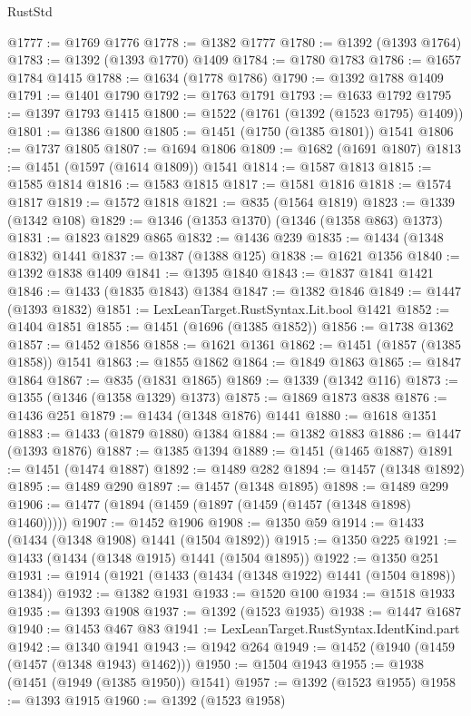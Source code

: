 \begin{lexlean}{RustStd}
\begin{coremodule}
@1777 := @1769 @1776
@1778 := @1382 @1777
@1780 := @1392 (@1393 @1764)
@1783 := @1392 (@1393 @1770) @1409
@1784 := @1780 @1783
@1786 := @1657 @1784 @1415
@1788 := @1634 (@1778 @1786)
@1790 := @1392 @1788 @1409
@1791 := @1401 @1790
@1792 := @1763 @1791
@1793 := @1633 @1792
@1795 := @1397 @1793 @1415
@1800 := @1522 (@1761 (@1392 (@1523 @1795) @1409))
@1801 := @1386 @1800
@1805 := @1451 (@1750 (@1385 @1801)) @1541
@1806 := @1737 @1805
@1807 := @1694 @1806
@1809 := @1682 (@1691 @1807)
@1813 := @1451 (@1597 (@1614 @1809)) @1541
@1814 := @1587 @1813
@1815 := @1585 @1814
@1816 := @1583 @1815
@1817 := @1581 @1816
@1818 := @1574 @1817
@1819 := @1572 @1818
@1821 := @835 (@1564 @1819)
@1823 := @1339 (@1342 @108)
@1829 := @1346 (@1353 @1370) (@1346 (@1358 @863) @1373)
@1831 := @1823 @1829 @865
@1832 := @1436 @239
@1835 := @1434 (@1348 @1832) @1441
@1837 := @1387 (@1388 @125)
@1838 := @1621 @1356
@1840 := @1392 @1838 @1409
@1841 := @1395 @1840
@1843 := @1837 @1841 @1421
@1846 := @1433 (@1835 @1843) @1384
@1847 := @1382 @1846
@1849 := @1447 (@1393 @1832)
@1851 := LexLeanTarget.RustSyntax.Lit.bool @1421
@1852 := @1404 @1851
@1855 := @1451 (@1696 (@1385 @1852))
@1856 := @1738 @1362
@1857 := @1452 @1856
@1858 := @1621 @1361
@1862 := @1451 (@1857 (@1385 @1858)) @1541
@1863 := @1855 @1862
@1864 := @1849 @1863
@1865 := @1847 @1864
@1867 := @835 (@1831 @1865)
@1869 := @1339 (@1342 @116)
@1873 := @1355 (@1346 (@1358 @1329) @1373)
@1875 := @1869 @1873 @838
@1876 := @1436 @251
@1879 := @1434 (@1348 @1876) @1441
@1880 := @1618 @1351
@1883 := @1433 (@1879 @1880) @1384
@1884 := @1382 @1883
@1886 := @1447 (@1393 @1876)
@1887 := @1385 @1394
@1889 := @1451 (@1465 @1887)
@1891 := @1451 (@1474 @1887)
@1892 := @1489 @282
@1894 := @1457 (@1348 @1892)
@1895 := @1489 @290
@1897 := @1457 (@1348 @1895)
@1898 := @1489 @299
@1906 := @1477 (@1894 (@1459 (@1897 (@1459 (@1457 (@1348 @1898) @1460)))))
@1907 := @1452 @1906
@1908 := @1350 @59
@1914 := @1433 (@1434 (@1348 @1908) @1441 (@1504 @1892))
@1915 := @1350 @225
@1921 := @1433 (@1434 (@1348 @1915) @1441 (@1504 @1895))
@1922 := @1350 @251
@1931 := @1914 (@1921 (@1433 (@1434 (@1348 @1922) @1441 (@1504 @1898)) @1384))
@1932 := @1382 @1931
@1933 := @1520 @100
@1934 := @1518 @1933
@1935 := @1393 @1908
@1937 := @1392 (@1523 @1935)
@1938 := @1447 @1687
@1940 := @1453 @467 @83
@1941 := LexLeanTarget.RustSyntax.IdentKind.part
@1942 := @1340 @1941
@1943 := @1942 @264
@1949 := @1452 (@1940 (@1459 (@1457 (@1348 @1943) @1462)))
@1950 := @1504 @1943
@1955 := @1938 (@1451 (@1949 (@1385 @1950)) @1541)
@1957 := @1392 (@1523 @1955)
@1958 := @1393 @1915
@1960 := @1392 (@1523 @1958)

\end{coremodule}
\end{lexlean}
